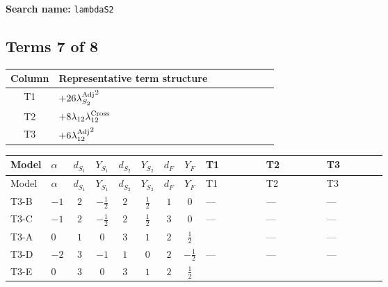 \documentclass[8pt]{article}
\begin{document}
\begin{landscape}
\begin{longtable}{@{}llcccccc >{\raggedright\arraybackslash}p{0.21\linewidth} >{\raggedright\arraybackslash}p{0.21\linewidth} >{\raggedright\arraybackslash}p{0.21\linewidth}@{}}
\midrule
\bottomrule
\end{longtable}
\clearpage
\noindent\textbf{Search name: }\texttt{lambdaS2}\par\smallskip
\subsection*{Terms 7 of 8}
\begin{center}
\begin{tabular}{@{}c >{\raggedright\arraybackslash}p{0.82\linewidth}@{}}
\toprule
Column & Representative term structure \\
\midrule
T1 & \(\displaystyle +26 {\lambda_{S_2}^{\rm Adj}}^2\) \\
\midrule
T2 & \(\displaystyle +8 {\lambda_{12}} {\lambda_{12}^{\rm Cross}}\) \\
\midrule
T3 & \(\displaystyle +6 {\lambda_{12}^{\rm Adj}}^2\) \\
\midrule
\bottomrule
\end{tabular}
\end{center}
\smallskip
\tiny
\begin{longtable}{@{}llcccccc >{\raggedright\arraybackslash}p{0.21\linewidth} >{\raggedright\arraybackslash}p{0.21\linewidth} >{\raggedright\arraybackslash}p{0.21\linewidth}@{}}
\toprule
Model & $\alpha$ & $d_{S_1}$ & $Y_{S_1}$ & $d_{S_2}$ & $Y_{S_2}$ & $d_F$ & $Y_F$ & T1 & T2 & T3 \\
\midrule
\endfirsthead
\toprule
Model & $\alpha$ & $d_{S_1}$ & $Y_{S_1}$ & $d_{S_2}$ & $Y_{S_2}$ & $d_F$ & $Y_F$ & T1 & T2 & T3 \\
\midrule
\endhead
T3-B & $-1$ & $2$ & $-\frac{1}{2}$ & $2$ & $\frac{1}{2}$ & $1$ & $0$ & --- & --- & --- \\
\midrule
T3-C & $-1$ & $2$ & $-\frac{1}{2}$ & $2$ & $\frac{1}{2}$ & $3$ & $0$ & --- & --- & --- \\
\midrule
T3-A & $0$ & $1$ & $0$ & $3$ & $1$ & $2$ & $\frac{1}{2}$ & \scriptsize\adjustbox{max width=\linewidth}{$\begin{gathered} +26 {\lambda_{S_2}^{\rm Adj}}^2\end{gathered}$} & --- & --- \\
\midrule
T3-D & $-2$ & $3$ & $-1$ & $1$ & $0$ & $2$ & $-\frac{1}{2}$ & --- & --- & --- \\
\midrule
T3-E & $0$ & $3$ & $0$ & $3$ & $1$ & $2$ & $\frac{1}{2}$ & \scriptsize\adjustbox{max width=\linewidth}{$\begin{gathered} +26 {\lambda_{S_2}^{\rm Adj}}^2\end{gathered}$} & \scriptsize\adjustbox{max width=\linewidth}{$\begin{gathered} +8 {\lambda_{12}} {\lambda_{12}^{\rm Cross}}\end{gathered}$} & \scriptsize\adjustbox{max width=\linewidth}{$\begin{gathered} +6 {\lambda_{12}^{\rm Adj}}^2\end{gathered}$} \\

\end{longtable}
\end{landscape}
\end{document}
